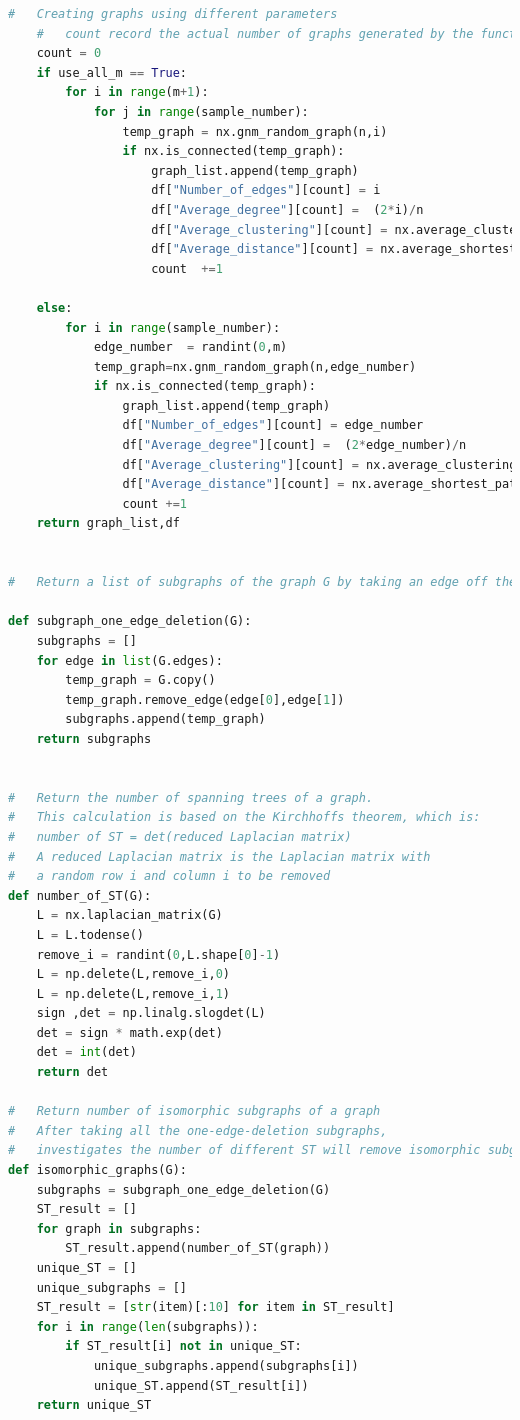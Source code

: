 \documentclass[12pt]{article}
\begin{document}
{\begin{lstlisting}[language=Python,breaklines=true]
    #   Creating graphs using different parameters
    #   count record the actual number of graphs generated by the function
    count = 0
    if use_all_m == True:
        for i in range(m+1):
            for j in range(sample_number):
                temp_graph = nx.gnm_random_graph(n,i)
                if nx.is_connected(temp_graph):
                    graph_list.append(temp_graph)
                    df["Number_of_edges"][count] = i
                    df["Average_degree"][count] =  (2*i)/n
                    df["Average_clustering"][count] = nx.average_clustering(temp_graph)
                    df["Average_distance"][count] = nx.average_shortest_path_length(temp_graph)
                    count  +=1

    else:
        for i in range(sample_number):
            edge_number  = randint(0,m)
            temp_graph=nx.gnm_random_graph(n,edge_number)
            if nx.is_connected(temp_graph):
                graph_list.append(temp_graph)
                df["Number_of_edges"][count] = edge_number
                df["Average_degree"][count] =  (2*edge_number)/n
                df["Average_clustering"][count] = nx.average_clustering(temp_graph)
                df["Average_distance"][count] = nx.average_shortest_path_length(temp_graph)
                count +=1
    return graph_list,df


#   Return a list of subgraphs of the graph G by taking an edge off the graph

def subgraph_one_edge_deletion(G):
    subgraphs = []
    for edge in list(G.edges):
        temp_graph = G.copy()
        temp_graph.remove_edge(edge[0],edge[1])
        subgraphs.append(temp_graph)
    return subgraphs


#   Return the number of spanning trees of a graph.
#   This calculation is based on the Kirchhoffs theorem, which is:
#   number of ST = det(reduced Laplacian matrix)
#   A reduced Laplacian matrix is the Laplacian matrix with
#   a random row i and column i to be removed
def number_of_ST(G):
    L = nx.laplacian_matrix(G)
    L = L.todense()
    remove_i = randint(0,L.shape[0]-1)
    L = np.delete(L,remove_i,0)
    L = np.delete(L,remove_i,1)
    sign ,det = np.linalg.slogdet(L)
    det = sign * math.exp(det)
    det = int(det)
    return det

#   Return number of isomorphic subgraphs of a graph
#   After taking all the one-edge-deletion subgraphs,
#   investigates the number of different ST will remove isomorphic subgraphs
def isomorphic_graphs(G):
    subgraphs = subgraph_one_edge_deletion(G)
    ST_result = []
    for graph in subgraphs:
        ST_result.append(number_of_ST(graph))
    unique_ST = []
    unique_subgraphs = []
    ST_result = [str(item)[:10] for item in ST_result]
    for i in range(len(subgraphs)):
        if ST_result[i] not in unique_ST:
            unique_subgraphs.append(subgraphs[i])
            unique_ST.append(ST_result[i])
    return unique_ST


\end{lstlisting}}
\end{document}
